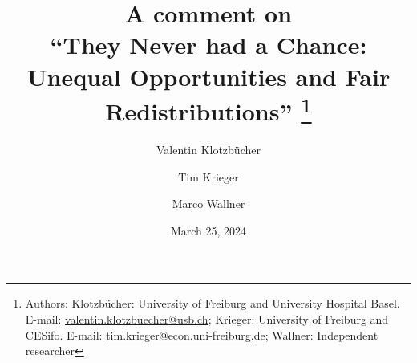 \documentclass[12pt,a4paper]{article}
\begin{document}
\date{March 25, 2024}

\title{
\textbf{A comment on } \\[0.25cm]
\textbf{``They Never had a Chance: Unequal Opportunities and Fair Redistributions''}%
%
 \thanks{
Authors: Klotzbücher: University of Freiburg and University Hospital Basel. E-mail: \href{mailto:valentin.klotzbuecher@usb.ch}{valentin.klotzbuecher@usb.ch};
 Krieger: University of Freiburg and CESifo. E-mail: \href{mailto:tim.krieger@econ.uni-freiburg.de}{tim.krieger@econ.uni-freiburg.de};
Wallner: Independent researcher
}
}
\author{Valentin Klotzbücher \and Tim Krieger \and Marco Wallner}

\maketitle
\end{document}
